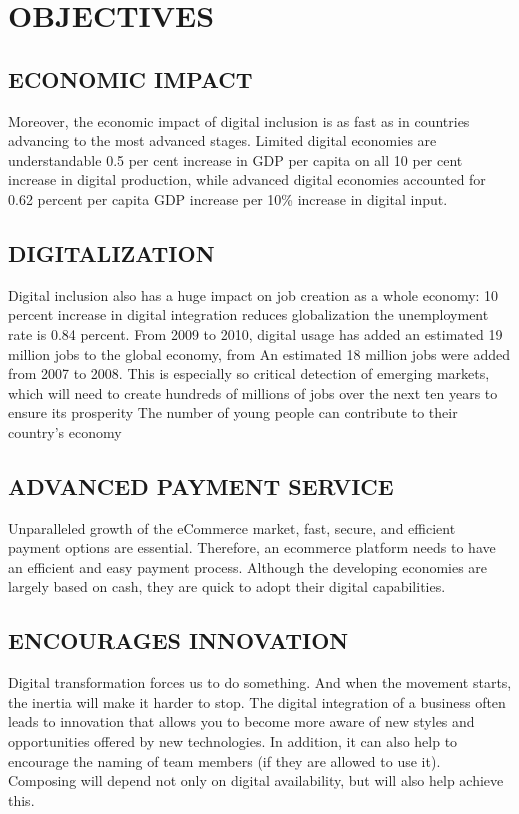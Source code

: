 \documentclass{article}
\begin{document}
\section{OBJECTIVES}
\subsection{ECONOMIC IMPACT}
Moreover, the economic impact of digital inclusion is as fast as in countries advancing to the most advanced stages. Limited
digital economies are understandable 0.5 per cent increase in GDP per capita on all 10 per cent increase in digital production,
while advanced digital economies accounted for 0.62 percent per capita GDP increase per 10\% increase in digital input.
\subsection{DIGITALIZATION}
Digital inclusion also has a huge impact on job creation as a whole economy: 10 percent increase in digital integration
reduces globalization the unemployment rate is 0.84 percent. From 2009 to 2010, digital usage has added an estimated 19 million
jobs to the global economy, from An estimated 18 million jobs were added from 2007 to 2008. This is especially so critical
detection of emerging markets, which will need to create hundreds of millions of jobs over the next ten years to ensure its
prosperity The number of young people can contribute to their country's economy
\subsection{ADVANCED PAYMENT SERVICE}
Unparalleled growth of the eCommerce market, fast, secure, and efficient payment options are essential. Therefore, an ecommerce platform needs to have an efficient and easy payment process. Although the developing economies are largely based
on cash, they are quick to adopt their digital capabilities.
\subsection{ENCOURAGES INNOVATION}
Digital transformation forces us to do something. And when the movement starts, the inertia will make it harder to stop.
The digital integration of a business often leads to innovation that allows you to become more aware of new styles and
opportunities offered by new technologies. In addition, it can also help to encourage the naming of team members (if they are
allowed to use it). Composing will depend not only on digital availability, but will also help achieve this.
\end{document}
